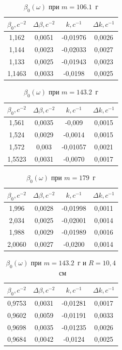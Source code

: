 \documentclass[a4paper,12pt]{article} %
\begin{document}
\begin{table}[!ht]
    \centering
    \begin{tabular}{|c|c|c|c|}
    \hline
        $\beta_0, c^{-2}$ & $\Delta \beta, c^{-2}$ & $k, c^{-1}$ & $\Delta k, c^{-1}$ \\ \hline
        1,162 & 0,0051 & -0,01976 & 0,0026  \\ \hline
        1,144 & 0,0023 & -0,02033 & 0,0027  \\ \hline
        1,133 & 0,0025 & -0,01943 & 0,0023  \\ \hline
        1,1463 & 0,0033 & -0,0198 & 0,0025  \\ \hline
    \end{tabular}
    \caption{$\beta_0(\omega)$ при $m=106.1$~г}
\end{table}
\begin{table}[!ht]
    \centering
    \begin{tabular}{|c|c|c|c|}
    \hline
        $\beta_0, c^{-2}$ & $\Delta \beta, c^{-2}$ &$ k, c^{-1}$ & $\Delta k, c^{-1}$ \\ \hline
        1,561 & 0,0035 & -0,009 & 0,0015  \\ \hline
        1,524 & 0,0029 & -0,0014 & 0,0015  \\ \hline
        1,572 & 0,003 & -0,01057 & 0,0021  \\ \hline
        1,5523 & 0,0031 & -0,0070 & 0,0017  \\ \hline
    \end{tabular}
    \caption{$\beta_0(\omega)$ при $m=143.2$~г}
\end{table}
\begin{table}[!ht]
    \centering
    \begin{tabular}{|c|c|c|c|}
    \hline
        $\beta_0, c^{-2}$ & $\Delta \beta, c^{-2}$ & $k, c^{-1}$ & $\Delta k, c^{-1}$ \\ \hline
        1,996 & 0,0028 & -0,01998 & 0,0011  \\ \hline
        2,034 & 0,0025 & -0,02001 & 0,0014  \\ \hline
        1,988 & 0,0029 & -0,01989 & 0,0016  \\ \hline
        2,0060 & 0,0027 & -0,0200 & 0,0014  \\ \hline
    \end{tabular}
    \caption{$\beta_0(\omega)$ при $m=179$~г}
\end{table}
\begin{table}[!ht]
    \centering
    \begin{tabular}{|c|c|c|c|}
    \hline
        $\beta_0, c^{-2}$ & $\Delta \beta, c^{-2}$ & $k, c^{-1}$ & $\Delta k, c^{-1}$ \\ \hline
        0,9753 & 0,0031 & -0,01281 & 0,0017  \\ \hline
        0,9602 & 0,0059 & -0,01191 & 0,0033  \\ \hline
        0,9698 & 0,0035 & -0,01235 & 0,0026  \\ \hline
        0,9684 & 0,0042 & -0,0124 & 0,0025  \\ \hline
    \end{tabular}
    \caption{$\beta_0(\omega)$ при $m=143.2$~г и $R= 10,4$~см}
\end{table}
\end{document}
